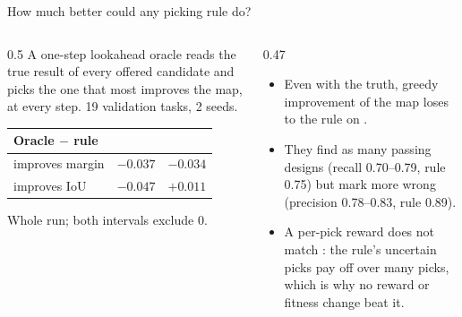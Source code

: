 \begin{frame}{How much better could any picking rule do?}
  \begin{columns}[T]
    \begin{column}{0.5\textwidth}
      \small
      A \alert{one-step lookahead oracle} reads the true result of every offered candidate and picks the one that most
      improves the map, at every step. 19 validation tasks, 2 seeds.

      \vspace{2mm}
      \centering
      \begin{tabular}{@{}lcc@{}}
        \toprule
        Oracle $-$ rule & \passfail{} & \prederr{} \\
        \midrule
        improves margin & $-0.037$ & $\mathbf{-0.034}$ \\
        improves IoU & $-0.047$ & $+0.011$ \\
        \bottomrule
      \end{tabular}

      \vspace{1mm}
      \footnotesize Whole run; both \passfail{} intervals exclude 0.
    \end{column}
    \begin{column}{0.47\textwidth}
      \small
      \begin{itemize}
        \item Even with the truth, greedy improvement of the map \alert{loses to the rule} on \passfail{}.
          \item They find as many passing designs (recall 0.70--0.79, rule 0.75) but mark more wrong (precision
          0.78--0.83, rule 0.89).
        \item A per-pick reward does not match \passfail{}: the rule's uncertain picks pay off over many picks, which
          is why no reward or fitness change beat it.
      \end{itemize}
    \end{column}
  \end{columns}
\end{frame}

